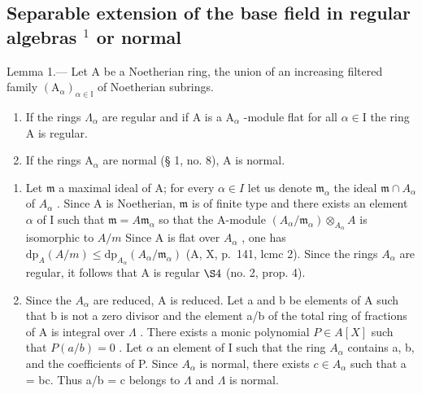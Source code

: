 \subsection{\texorpdfstring{Separable extension of the base field in regular algebras \(^{1}\) or normal}{Separable extension of the base field in regular or normal algebras (1)}}

Lemma 1.--- Let A be a Noetherian ring, the union of an increasing filtered family \((\mathrm{A}_{\alpha})_{\alpha\in\mathbb{I}}\) of Noetherian subrings.

\begin{enumerate}
\def\labelenumi{\alph{enumi})}
\item
  If the rings \(\Lambda_{\alpha}\) are regular and if A is a \(\mathrm{A}_{\alpha}\) -module flat for all \(\alpha \in \mathrm{I}\) the ring A is regular.
\item
  If the rings \(\mathrm{A}_{\alpha}\) are normal (§ 1, no. 8), A is normal.
\end{enumerate}

\begin{enumerate}
\def\labelenumi{\alph{enumi})}
\item
  Let \(\mathfrak{m}\) a maximal ideal of A; for every \(\alpha \in I\) let us denote \(\mathfrak{m}_{\alpha}\) the ideal \(\mathfrak{m} \cap A_{\alpha}\) of \(A_{\alpha}\) . Since A is Noetherian, \(\mathfrak{m}\) is of finite type and there exists an element \(\alpha\) of I such that \(\mathfrak{m} = A\mathfrak{m}_{\alpha}\) so that the A-module \((A_{\alpha}/\mathfrak{m}_{\alpha}) \otimes_{A_{\alpha}} A\) is isomorphic to \(A/m\) Since A is flat over \(A_{\alpha}\) , one has \(\mathrm{dp}_{A}(A/m) \leqslant \mathrm{dp}_{A_{\alpha}}(A_{\alpha}/\mathfrak{m}_{\alpha})\) (A, X, p.~141, lcmc 2). Since the rings \(A_{\alpha}\) are regular, it follows that A is regular \(\S 4\) (no. 2, prop. 4).
\item
  Since the \(A_{\alpha}\) are reduced, A is reduced. Let a and b be elements of A such that b is not a zero divisor and the element a/b of the total ring of fractions of A is integral over \(\Lambda\) . There exists a monic polynomial \(P \in A[X]\) such that \(P(a/b) = 0\) . Let \(\alpha\) an element of I such that the ring \(A_{\alpha}\) contains a, b, and the coefficients of P. Since \(A_{\alpha}\) is normal, there exists \(c \in A_{\alpha}\) such that a = bc. Thus a/b = c belongs to \(\Lambda\) and \(\Lambda\) is normal.
\end{enumerate}


